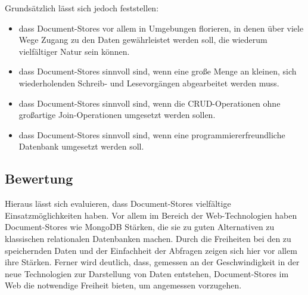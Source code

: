 Grundsätzlich lässt sich jedoch feststellen:
\begin{itemize}
\item dass Document-Stores vor allem in Umgebungen florieren, in denen über viele Wege Zugang zu den Daten gewährleistet werden soll, die wiederum vielfältiger Natur sein können. 
\item dass Document-Stores sinnvoll sind, wenn eine große Menge an kleinen, sich wiederholenden Schreib- und Lesevorgängen abgearbeitet werden muss.
\item dass Document-Stores sinnvoll sind, wenn die CRUD-Operationen ohne großartige Join-Operationen umgesetzt werden sollen.
\item dass Document-Stores sinnvoll sind, wenn eine programmiererfreundliche Datenbank umgesetzt werden soll.
\end{itemize}

\subsection{Bewertung}
Hieraus lässt sich evaluieren, dass Document-Stores vielfältige Einsatzmöglichkeiten haben. Vor allem im Bereich der Web-Technologien haben Document-Stores wie MongoDB Stärken, die sie zu guten Alternativen zu klassischen relationalen Datenbanken machen. Durch die Freiheiten bei den zu speichernden Daten und der Einfachheit der Abfragen zeigen sich hier vor allem ihre Stärken. Ferner wird deutlich, dass, gemessen an der Geschwindigkeit in der neue Technologien zur Darstellung von Daten entstehen, Document-Stores im Web die notwendige Freiheit bieten, um angemessen vorzugehen.
